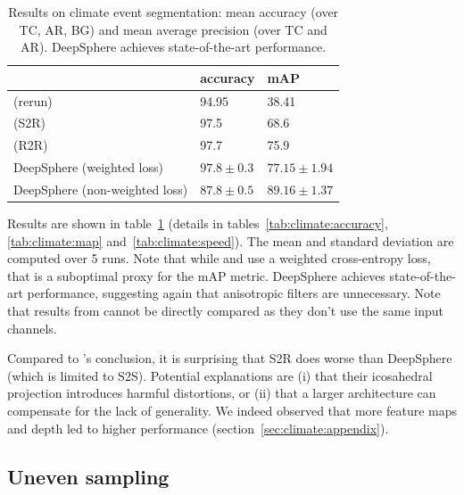 \documentclass{article} %
\newcommand{\tabref}[1]{table~\ref{tab:#1}}
\newcommand{\secref}[1]{section~\ref{sec:#1}}
\begin{document}
\begin{table}
	\centering
	\begin{tabular}{l l l}
	\toprule
	& accuracy & mAP \\
	\midrule
	\cite{jiang2019sphericalcnn} (rerun) & 94.95 & 38.41 \\
	\cite{cohen2019gauge} (S2R) & 97.5 & 68.6 \\
	\cite{cohen2019gauge} (R2R) & 97.7 & 75.9 \\
	DeepSphere (weighted loss) & $97.8\pm 0.3$ & $77.15\pm 1.94$ \\
	DeepSphere (non-weighted loss) & $87.8\pm 0.5$ & $89.16\pm 1.37$ \\
	\bottomrule
	\end{tabular}
	\caption{
		Results on climate event segmentation: mean accuracy (over TC, AR, BG) and mean average precision (over TC and AR).
		DeepSphere achieves state-of-the-art performance. %
	}
	\label{tab:climate}
\end{table}

Results are shown in \tabref{climate} (details in tables~\ref{tab:climate:accuracy}, \ref{tab:climate:map} and~\ref{tab:climate:speed}).
The mean and standard deviation are computed over 5 runs.
Note that while \citet{jiang2019sphericalcnn} and \citet{cohen2019gauge} use a weighted cross-entropy loss, that is a suboptimal proxy for the mAP metric.
DeepSphere achieves state-of-the-art performance, suggesting again that anisotropic filters are unnecessary.
Note that results from \citet{mudigonda2017climateevents} cannot be directly compared as they don't use the same input channels.

Compared to \citet{cohen2019gauge}'s conclusion, it is surprising that S2R does worse than DeepSphere (which is limited to S2S).
Potential explanations are (i) that their icosahedral projection introduces harmful distortions, or (ii) that a larger architecture can compensate for the lack of generality. %
We indeed observed that more feature maps and depth led to higher performance (\secref{climate:appendix}).

\subsection{Uneven sampling} \label{sec:exp:ghcn}
\end{document}
